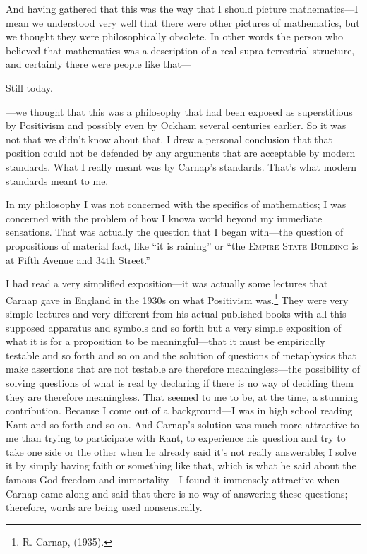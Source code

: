 And having gathered that this was the way that I should picture 
mathematics---I mean we understood very well that there were other 
pictures of mathematics, but we thought they were philosophically 
obsolete. In other words the person who believed that mathematics was 
a description of a real supra-terrestrial structure, and certainly there 
were people like that--- 

 Still today. 

 ---we thought that this was a philosophy that had been 
exposed as superstitious by Positivism and possibly even by Ockham 
several centuries earlier. So it was not that we didn't know about that. I 
drew a personal conclusion that that position could not be defended by 
any arguments that are acceptable by modern standards. What I really 
meant was by Carnap's standards. That's what modern standards 
meant to me. 

In my philosophy I was not concerned with the specifics of 
mathematics; I was concerned with the problem of how I knowa world 
beyond my immediate sensations. That was actually the question that I 
began with---the question of propositions of material fact, like \enquote{it is raining} 
or \enquote{the \textsc{Empire State Building} is at Fifth Avenue and 34th Street.} 

I had read a very simplified exposition---it was actually some 
lectures that Carnap gave in England in the 1930s on what Positivism 
was.\footnote{R. Carnap,  (1935).} 
They were very simple lectures and very different from his actual 
published books with all this supposed apparatus and symbols and so 
forth but a very simple exposition of what it is for a proposition to be 
meaningful---that it must be empirically testable and so forth and so on 
and the solution of questions of metaphysics that make assertions that 
are not testable are therefore meaningless---the possibility of solving 
questions of what is real by declaring if there is no way of deciding them 
they are therefore meaningless. That seemed to me to be, at the time, a 
stunning contribution. Because I come out of a background---I was in 
high school reading Kant and so forth and so on. And Carnap's 
solution was much more attractive to me than trying to participate with 
Kant, to experience his question and try to take one side or the other 
when he already said it's not really answerable; I solve it by simply 
having faith or something like that, which is what he said about the 
famous God freedom and immortality---I found it immensely attractive 
when Carnap came along and said that there is no way of answering 
these questions; therefore, words are being used nonsensically. 

